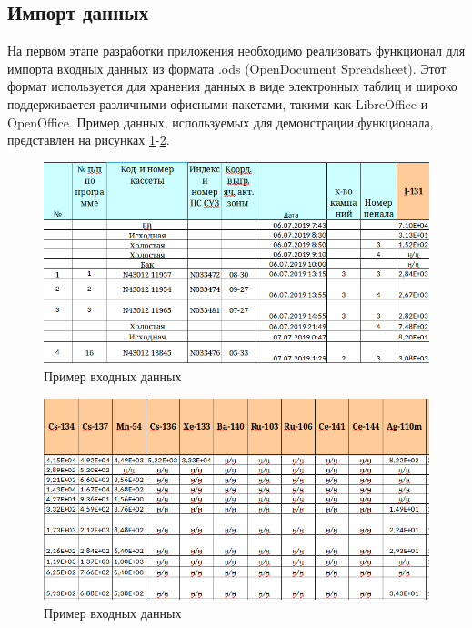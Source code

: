 \subsection{Импорт данных}

На первом этапе разработки приложения необходимо реализовать функционал для импорта входных данных из формата .ods (OpenDocument Spreadsheet). Этот формат используется для хранения данных в виде электронных таблиц и широко поддерживается различными офисными пакетами, такими как LibreOffice и OpenOffice. Пример данных, используемых для демонстрации функционала, представлен на рисунках \ref{fig:ris4}-\ref{fig:ris5}.

\begin{figure}[H]
	\centering
	\includegraphics[width=1\linewidth]{pics/ris4} %
	\caption{Пример входных данных}
	\label{fig:ris4} %
\end{figure}

\begin{figure}[H]
	\centering
	\includegraphics[width=1\linewidth]{pics/ris5} %
	\caption{Пример входных данных}
	\label{fig:ris5} %
\end{figure}

